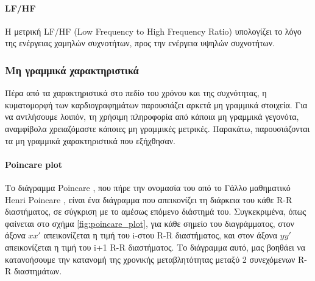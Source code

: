 \paragraph{LF/HF}
Η μετρική LF/HF (Low Frequency to High Frequency Ratio) υπολογίζει το λόγο της ενέργειας χαμηλών συχνοτήτων, προς την ενέργεια υψηλών συχνοτήτων.



\subsubsection{Μη γραμμικά χαρακτηριστικά}

Πέρα από τα χαρακτηριστικά στο πεδίο του χρόνου και της συχνότητας, η κυματομορφή των καρδιογραφημάτων παρουσιάζει αρκετά μη γραμμικά στοιχεία. Για να αντλήσουμε λοιπόν, τη χρήσιμη πληροφορία από κάποια μη γραμμικά γεγονότα, αναμφίβολα χρειαζόμαστε κάποιες μη γραμμικές μετρικές. Παρακάτω, παρουσιάζονται τα μη γραμμικά χαρακτηριστικά που εξήχθησαν.

\paragraph{Poincare plot}

Το διάγραμμα Poincare \cite{wikiPoincare}, που πήρε την ονομασία του από το Γάλλο μαθηματικό Henri Poincare \cite{wikiHenriPoincare}, είναι ένα διάγραμμα που απεικονίζει τη διάρκεια του κάθε R-R διαστήματος, σε σύγκριση με το αμέσως επόμενο διάστημά του. Συγκεκριμένα, όπως φαίνεται στο σχήμα \ref{fig:poincare_plot}, για κάθε σημείο του διαγράμματος, στον άξονα $xx'$ απεικονίζεται η τιμή του i-στου R-R διαστήματος, και στον άξονα $yy'$ απεικονίζεται η τιμή του i+1 R-R διαστήματος. Το διάγραμμα αυτό, μας βοηθάει να κατανοήσουμε την κατανομή της χρονικής μεταβλητότητας μεταξύ 2 συνεχόμενων R-R διαστημάτων.


